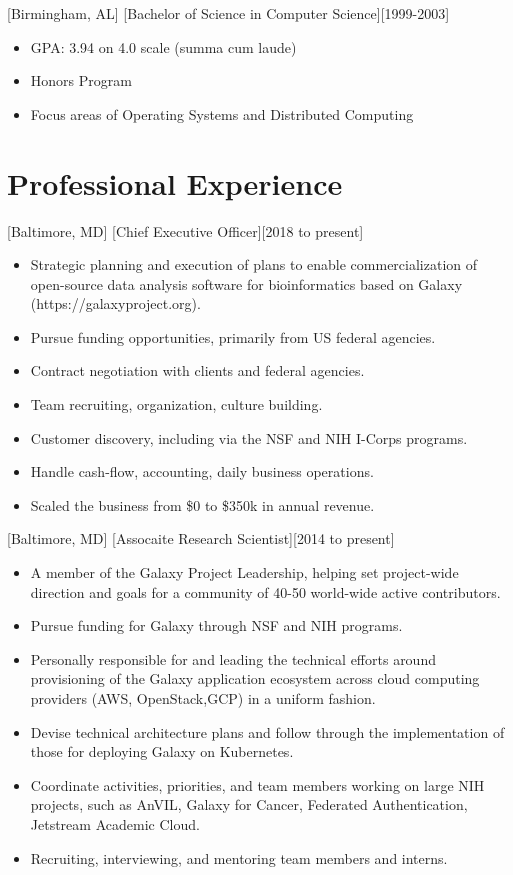 \documentclass{article}
\begin{document}
[Birmingham, AL]
[Bachelor of Science in Computer Science][1999-2003]
\begin{itemize}
    \item[] GPA: 3.94 on 4.0 scale (summa cum laude)
    \item[] Honors Program
    \item[] Focus areas of Operating Systems and Distributed Computing
\end{itemize}
 
 
\vspace{\parskip}%
\section{Professional Experience}

[Baltimore, MD]
[Chief Executive Officer][2018 to present]

\begin{itemize}
    \item Strategic planning and execution of plans to enable commercialization of open-source data analysis software for bioinformatics based on Galaxy (https://galaxyproject.org). 
    \item Pursue funding opportunities, primarily from US federal agencies.
    \item Contract negotiation with clients and federal agencies.
    \item Team recruiting, organization, culture building.
    \item Customer discovery, including via the NSF and NIH I-Corps programs.
    \item Handle cash-flow, accounting, daily business operations.
    \item Scaled the business from \$0 to \$350k in annual revenue.
\end{itemize}

[Baltimore, MD]
[Assocaite Research Scientist][2014 to present]

\begin{itemize}
    \item A member of the Galaxy Project Leadership, helping set project-wide direction and goals for a community of 40-50 world-wide active contributors.
    \item Pursue funding for Galaxy through NSF and NIH programs.
    \item Personally responsible for and leading the technical efforts around provisioning of the Galaxy application ecosystem across cloud computing providers (AWS, OpenStack,GCP) in a uniform fashion.
    \item Devise technical architecture plans and follow through the implementation of those for deploying Galaxy on Kubernetes.
    \item Coordinate activities, priorities, and team members working on large NIH projects, such as AnVIL, Galaxy for Cancer, Federated Authentication, Jetstream Academic Cloud.
    \item Recruiting, interviewing, and mentoring team members and interns.
\end{itemize}
\end{document}
